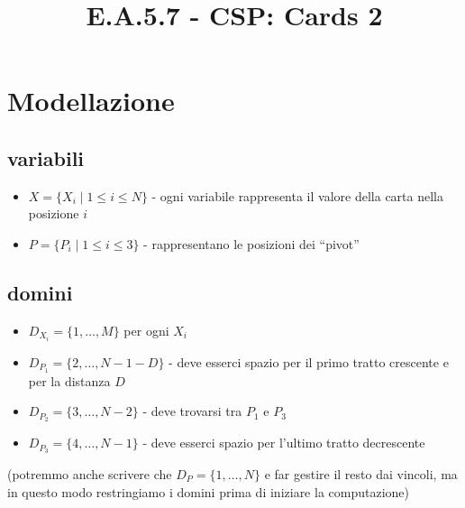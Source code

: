 \documentclass[12pt]{article}
\title{E.A.5.7 - CSP: Cards 2}
\author{}
\date{}
\begin{document}
\maketitle
\vspace{-5em}
\section{Modellazione}

\subsection*{variabili}
        \begin{itemize}
            \item $X =\{ X_i \mid 1\leq i \leq N\}$ - ogni variabile rappresenta il valore della carta nella posizione $i$
            \item $P = \{P_i \mid 1 \leq i \leq 3 \}$ - rappresentano le posizioni dei ``pivot''
        \end{itemize}
        \subsection*{domini}
        \begin{itemize}
            \item $D_{X_i} =\{ 1, \dots, M\}$ per ogni $X_i$
            \item $D_{P_1} = \{ 2, \dots, N - 1 - D \}$ - deve esserci spazio per il primo tratto crescente e per la distanza $D$
            \item $D_{P_2} = \{ 3, \dots, N - 2 \}$ - deve trovarsi tra $P_1$ e $P_3$
            \item $D_{P_3} = \{ 4, \dots, N - 1 \}$ - deve esserci spazio per l'ultimo tratto decrescente
        \end{itemize}
        (potremmo anche scrivere che $D_P = \{1, \dots, N\}$ e far gestire il resto dai vincoli, ma in questo modo restringiamo i domini prima di iniziare la computazione)
\end{document}

